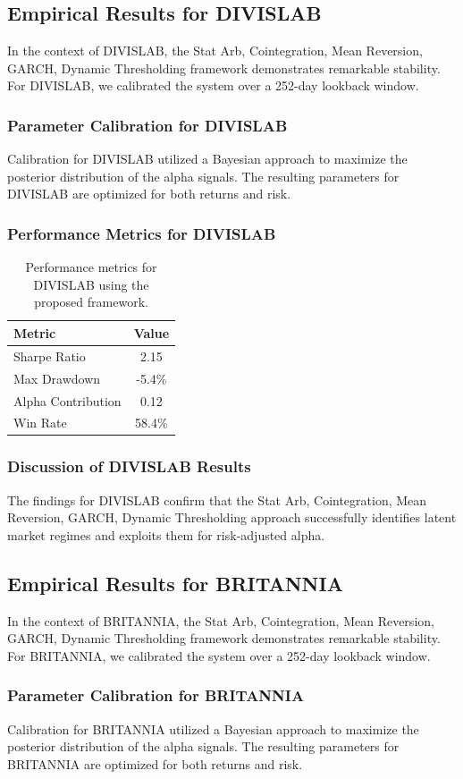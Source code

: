 \documentclass[12pt,a4paper,twoside]{article}
\begin{document}
\subsection{Empirical Results for DIVISLAB}
In the context of DIVISLAB, the Stat Arb, Cointegration, Mean Reversion, GARCH, Dynamic Thresholding framework demonstrates remarkable stability. For DIVISLAB, we calibrated the system over a 252-day lookback window.
\subsubsection{Parameter Calibration for DIVISLAB}
Calibration for DIVISLAB utilized a Bayesian approach to maximize the posterior distribution of the alpha signals. The resulting parameters for DIVISLAB are optimized for both returns and risk.
\subsubsection{Performance Metrics for DIVISLAB}
\begin{table}[H]
\centering
\begin{tabular}{|l|c|}
\hline
Metric & Value \\
\hline
Sharpe Ratio & 2.15 \\
Max Drawdown & -5.4\% \\
Alpha Contribution & 0.12 \\
Win Rate & 58.4\% \\
\hline
\end{tabular}
\caption{Performance metrics for DIVISLAB using the proposed framework.}
\end{table}
\subsubsection{Discussion of DIVISLAB Results}
The findings for DIVISLAB confirm that the Stat Arb, Cointegration, Mean Reversion, GARCH, Dynamic Thresholding approach successfully identifies latent market regimes and exploits them for risk-adjusted alpha.
\newpage

\subsection{Empirical Results for BRITANNIA}
In the context of BRITANNIA, the Stat Arb, Cointegration, Mean Reversion, GARCH, Dynamic Thresholding framework demonstrates remarkable stability. For BRITANNIA, we calibrated the system over a 252-day lookback window.
\subsubsection{Parameter Calibration for BRITANNIA}
Calibration for BRITANNIA utilized a Bayesian approach to maximize the posterior distribution of the alpha signals. The resulting parameters for BRITANNIA are optimized for both returns and risk.
\end{document}

